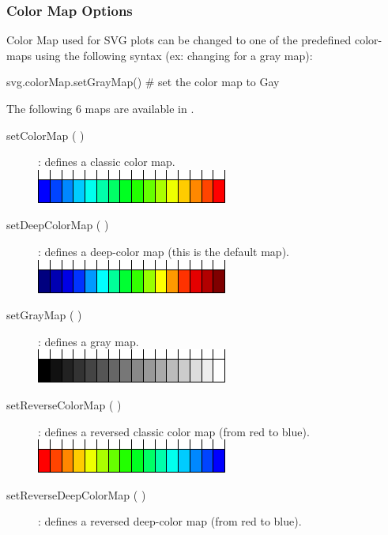 \subsubsection{Color Map Options}\label{sec:PL!SVG!ColorMap}
Color Map used for SVG plots can be changed to one of the predefined color-maps using the following syntax (ex: changing for a gray map):
\begin{PythonListing}
svg.colorMap.setGrayMap() # set the color map to Gay
\end{PythonListing}
The following 6 maps are available in \DynELA.
\begin{description}
\item [{setColorMap ( )}] : defines a classic color map.\\
 \hspace*{0.2\columnwidth}\includegraphics{Figures/ProgrammingLanguage/ColorMap}
\item [{setDeepColorMap ( )}] : defines a deep-color map (this is the \textsf{default} map).\\
 \hspace*{0.2\columnwidth}\includegraphics{Figures/ProgrammingLanguage/DeepColorMap}
\item [{setGrayMap ( )}] : defines a gray map.\\
 \hspace*{0.2\columnwidth}\includegraphics{Figures/ProgrammingLanguage/GrayMap}
\item [{setReverseColorMap ( )}] : defines a reversed classic color map (from red to blue).\\
 \hspace*{0.2\columnwidth}\includegraphics{Figures/ProgrammingLanguage/ReverseColorMap}
\item [{setReverseDeepColorMap ( )}] : defines a reversed deep-color map (from red to blue).\\

\end{description}
